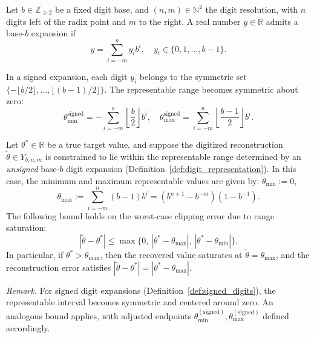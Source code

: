 \documentclass[10pt,a4paper]{amsart}
\begin{document}
\begin{definition}\label{def:digit_representation}
Let $b \in \mathbb{Z}_{\geq 2}$ be a fixed digit base, and $(n,m) \in \mathbb{N}^2$ the digit resolution, with $n$ digits left of the radix point and $m$ to the right. A real number $y \in \mathbb{R}$ admits a base-$b$ expansion if
\begin{equation}
y = \sum_{i=-m}^{n} y_i b^i, \quad y_i \in \{0,1,\ldots,b-1\}.
\end{equation}
\end{definition}

\begin{definition}\label{def:signed_digits}
In a signed expansion, each digit $y_i$ belongs to the symmetric set $\{-\lfloor b/2 \rfloor, \ldots, \lfloor (b-1)/2 \rfloor\}$. The representable range becomes symmetric about zero:
\begin{equation}
\theta_{\min}^{\text{signed}} = -\sum_{i=-m}^{n} \left\lfloor \frac{b}{2} \right\rfloor b^i, \quad
\theta_{\max}^{\text{signed}} = \sum_{i=-m}^{n} \left\lfloor \frac{b-1}{2} \right\rfloor b^i.
\end{equation}
\end{definition}

\begin{proposition}
\label{prop:clipping}
Let \( \theta^* \in \mathbb{R} \) be a true target value, and suppose the digitized reconstruction \( \tilde{\theta} \in Y_{b,n,m} \) is constrained to lie within the representable range determined by an \emph{unsigned} base-\( b \) digit expansion (Definition~\ref{def:digit_representation}). In this case, the minimum and maximum representable values are given by: $\theta_{\min} := 0$,
\[
\theta_{\max} := \sum_{i=-m}^{n} (b-1) b^i = (b^{n+1} - b^{-m})(1 - b^{-1}).
\]
The following bound holds on the worst-case clipping error due to range saturation:
\begin{equation}
|\tilde{\theta} - \theta^*| \leq \max \big\{ 0,\, |\theta^* - \theta_{\max}|,\, |\theta^* - \theta_{\min}| \big\}.
\end{equation}
In particular, if \( \theta^* > \theta_{\max} \), then the recovered value saturates at \( \tilde{\theta} = \theta_{\max} \), and the reconstruction error satisfies \( |\tilde{\theta} - \theta^*| = |\theta^* - \theta_{\max}| \).

\medskip

\noindent
\textit{Remark.} For signed digit expansions (Definition~\ref{def:signed_digits}), the representable interval becomes symmetric and centered around zero. An analogous bound applies, with adjusted endpoints \( \theta_{\min}^{\mathrm{(signed)}}, \theta_{\max}^{\mathrm{(signed)}} \) defined accordingly.
\end{proposition}
\end{document}
